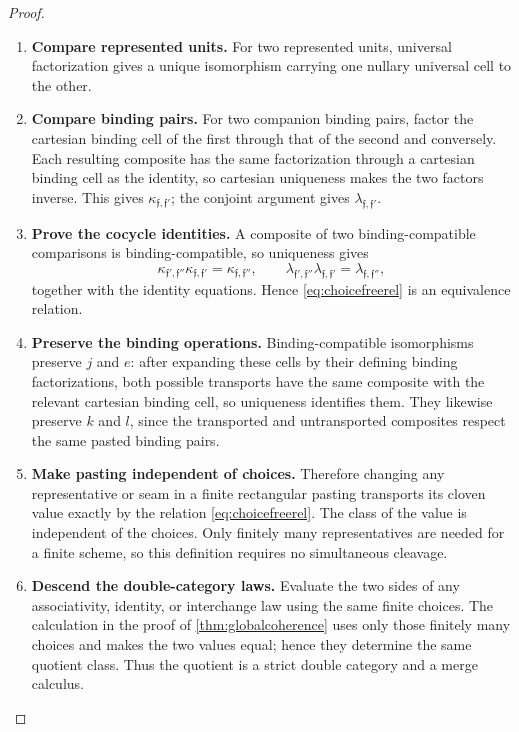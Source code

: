 \documentclass[11pt,reqno]{amsart}
\theoremstyle{plain}
\theoremstyle{definition}
\theoremstyle{remark}
\numberwithin{equation}{section}
\begin{document}
\begin{proof}\leavevmode
\begin{enumerate}
\item \textbf{Compare represented units.} For two represented units, universal factorization gives a unique
isomorphism carrying one nullary universal cell to the other.

\item \textbf{Compare binding pairs.} For two
companion binding pairs, factor the cartesian binding cell of the first
through that of the second and conversely. Each resulting composite has
the same factorization through a cartesian binding cell as the identity,
so cartesian uniqueness makes the two factors inverse. This gives
$\kappa_{\mathfrak f,\mathfrak f'}$; the conjoint argument gives
$\lambda_{\mathfrak f,\mathfrak f'}$.

\item \textbf{Prove the cocycle identities.} A composite of two
binding-compatible comparisons is binding-compatible, so uniqueness gives
\[
 \kappa_{\mathfrak f',\mathfrak f''}
 \kappa_{\mathfrak f,\mathfrak f'}
 =\kappa_{\mathfrak f,\mathfrak f''},\qquad
 \lambda_{\mathfrak f',\mathfrak f''}
 \lambda_{\mathfrak f,\mathfrak f'}
 =\lambda_{\mathfrak f,\mathfrak f''},
\]
together with the identity equations. Hence \cref{eq:choicefreerel} is
an equivalence relation.

\item \textbf{Preserve the binding operations.} Binding-compatible isomorphisms preserve $j$ and $e$: after expanding
these cells by their defining binding factorizations, both possible
transports have the same composite with the relevant cartesian binding
cell, so uniqueness identifies them. They likewise preserve $k$ and $l$,
since the transported and untransported composites respect the same
pasted binding pairs.

\item \textbf{Make pasting independent of choices.} Therefore changing any representative or seam in a
finite rectangular pasting transports its cloven value exactly by the
relation \cref{eq:choicefreerel}. The class of the value is independent
of the choices. Only finitely many representatives are needed for a finite
scheme, so this definition requires no simultaneous cleavage.

\item \textbf{Descend the double-category laws.} Evaluate the two sides of any associativity, identity, or interchange law
using the same finite choices. The calculation in the proof of
\cref{thm:globalcoherence} uses only those finitely many choices and makes
the two values equal; hence they determine the same quotient class. Thus
the quotient is a strict double category and a merge calculus.


\end{enumerate}
\end{proof}
\end{document}
